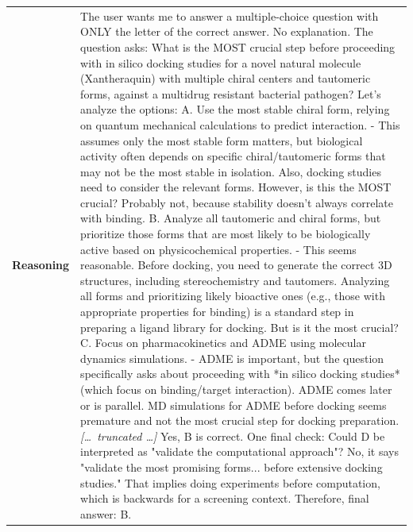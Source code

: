 \begin{longtable}{@{}l p{13cm}@{}}
  \textbf{Reasoning} & The user wants me to answer a multiple-choice question with ONLY the letter of the correct answer. No explanation. \newline The question asks: What is the MOST crucial step before proceeding with in silico docking studies for a novel natural molecule (Xantheraquin) with multiple chiral centers and tautomeric forms, against a multidrug resistant bacterial pathogen? \newline Let's analyze the options: \newline A. Use the most stable chiral form, relying on quantum mechanical calculations to predict interaction. \newline - This assumes only the most stable form matters, but biological activity often depends on specific chiral/tautomeric forms that may not be the most stable in isolation. Also, docking studies need to consider the relevant forms. However, is this the MOST crucial? Probably not, because stability doesn't always correlate with binding. \newline B. Analyze all tautomeric and chiral forms, but prioritize those forms that are most likely to be biologically active based on physicochemical properties. \newline - This seems reasonable. Before docking, you need to generate the correct 3D structures, including stereochemistry and tautomers. Analyzing all forms and prioritizing likely bioactive ones (e.g., those with appropriate properties for binding) is a standard step in preparing a ligand library for docking. But is it the most crucial? \newline C. Focus on pharmacokinetics and ADME using molecular dynamics simulations. \newline - ADME is important, but the question specifically asks about proceeding with *in silico docking studies* (which focus on binding/target interaction). ADME comes later or is parallel. MD simulations for ADME before docking seems premature and not the most crucial step for docking preparation. \newline \textit{[\ldots\ truncated \ldots]} \newline Yes, B is correct. \newline One final check: Could D be interpreted as "validate the computational approach"? No, it says "validate the most promising forms... before extensive docking studies." That implies doing experiments before computation, which is backwards for a screening context. \newline Therefore, final answer: B.  \\

\end{longtable}
